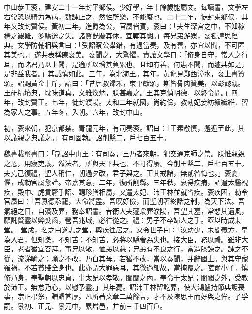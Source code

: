 
\begin{pinyinscope}
中山恭王衮，建安二十一年封平鄉侯。少好學，年十餘歲能屬文。每讀書，文學左右常恐以精力為病，數諫止之，然性所樂，不能廢也。二十二年，徙封東鄉侯，其年又改封贊侯。黃初二年，進爵為公，官屬皆賀，衮曰：「夫生深宮之中，不知稼穡之艱難，多驕逸之失。諸賢旣慶其休，宜輔其闕。」每兄弟游娛，衮獨譚思經典。文學防輔相與言曰：「受詔察公舉錯，有過當奏，及有善，亦宜以聞，不可匿其美也。」遂共表稱陳衮美。衮聞之，大驚懼，責讓文學曰：「脩身自守，常人之行耳，而諸君乃以上聞，是適所以增其負累也。且如有善，何患不聞，而遽共如是，是非益我者。」其誡慎如此。三年，為北海王。其年，黃龍見鄴西漳水，衮上書贊頌。詔賜黃金十斤，詔曰：「昔唐叔歸禾，東平獻頌，斯皆骨肉贊美，以彰懿親。王研精墳典，耽味道真，文雅煥炳，朕甚嘉之。王其克慎明德，以終令問。」四年，改封贊王。七年，徙封濮陽。太和二年就國，尚約儉，教勑妃妾紡績織絍，習為家人之事。五年冬，入朝。六年，改封中山。

初，衮來朝，犯京都禁。青龍元年，有司奏衮。詔曰：「王素敬慎，邂逅至此，其以議親之典議之。」有司固執。詔削縣二，戶七百五十。

魏書載璽書曰：「制詔中山王：有司奏，王乃者來朝，犯交通京師之禁。朕惟親親之恩，用寢吏議。然法者，所與天下共也，不可得廢。今削王縣二，戶七百五十。夫克己復禮，聖人稱仁，朝過夕改，君子與之。王其戒諸，無貳咎悔也。」衮憂懼，戒勑官屬愈謹。帝嘉其意，二年，復所削縣。三年秋，衮得疾病，詔遣太醫視疾，殿中、虎賁齎手詔、賜珍膳相屬，又遣太妃、沛王林並就省疾。衮疾困，勑令官屬曰：「吾寡德忝寵，大命將盡。吾旣好儉，而聖朝著終誥之制，為天下法。吾氣絕之日，自殯及葬，務奉詔書。昔衞大夫蘧瑗葬濮陽，吾望其墓，常想其遺風，願託賢靈以弊髮齒，營吾兆域，必往從之。禮：男子不卒婦人之手。亟以時成東堂。」堂成，名之曰遂志之堂，輿疾往居之。又令世子曰：「汝幼少，未聞義方，早為人君，但知樂，不知苦；不知苦，必將以驕奢為失也。接大臣，務以禮。雖非大臣，老者猶宜荅拜。事兄以敬，恤弟以慈；兄弟有不良之行，當造膝諫之。諫之不從，流涕喻之；喻之不改，乃白其母。若猶不改，當以奏聞，并辭國土。與其守寵罹禍，不若貧賤全身也。此亦謂大罪惡耳，其微過細故，當掩覆之。嗟爾小子，慎脩乃身，奉聖朝以忠貞，事太妃以孝敬。閨闈之內，奉令于太妃；閫閾之外，受教於沛王。無怠乃心，以慰予靈。」其年薨。詔沛王林留訖葬，使大鴻臚持節典護喪事，宗正弔祭，贈賵甚厚。凡所著文章二萬餘言，才不及陳思王而好與之侔。子孚嗣。景初、正元、景元中，累增邑，并前三千四百戶。


\end{pinyinscope}